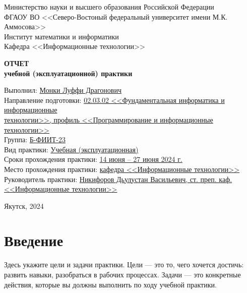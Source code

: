 \documentclass[12pt]{article}
\begin{document}
\thispagestyle{empty}
\begin{center}
  Министерство науки и высшего образования Российской Федерации \\
  ФГАОУ ВО <<Северо-Востоный федеральный университет имени М.К. Аммосова>> \\
  Институт математики и информатики \\
  Кафедра <<Информационные технологии>>
\end{center}

  \vfill
  
\begin{center}
  \Large{
    \textbf{ОТЧЕТ} \\
    \textbf{учебной (эксплуатационной) практики}
  }
\end{center}

\vfill

\begin{flushleft}
Выполнил: \underline{Монки Луффи Драгонович} \\
Направление подготовки: \underline{02.03.02 <<Фундаментальная информатика и информационные}\\ \underline{технологии>>, \; профиль <<Программирование и информационные технологии>>} \\
Группа: \underline{Б-ФИИТ-23} \\
Вид практики: \underline{Учебная (эксплуатационная)} \\
Сроки прохождения практики: \underline{14 июня -- 27 июня 2024 г.} \\
Место прохождения практики: \underline{кафедра <<Информационные технологии>>} \\
Руководитель практики: \underline{Никифоров Дьулустан Васильевич, \; ст. преп. каф.  <<Информационные технологии>>}
\end{flushleft}

\vfill

\begin{center}
  Якутск, 2024
\end{center}


\newpage \section*{Введение}

Здесь укажите цели и задачи практики. Цели --- это то, чего хочется достичь: развить навыки, разобраться в рабочих процессах. Задачи --- это конкретные действия, которые вы должны выполнить по ходу учебной практики.
\end{document}
